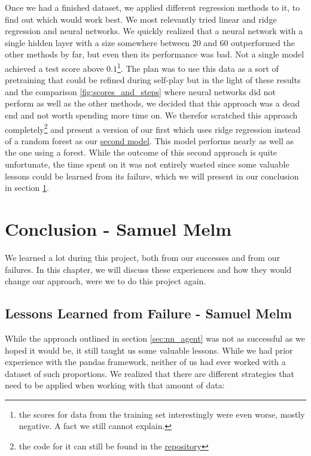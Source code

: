\documentclass{article}
\begin{document}
Once we had a finished dataset, we applied different regression methods to it, to find out which would work best. We most relevantly tried linear and ridge regression and neural networks. We quickly realized that a neural network with a single hidden layer with a size somewhere between 20 and 60 outperformed the other methods by far, but even then its performance was bad. Not a single model achieved a test score above $0.1$\footnote{the scores for data from the training set interestingly were even worse, mostly negative. A fact we still cannot explain.}. The plan was to use this data as a sort of pretraining that could be refined during self-play but in the light of these results and the comparison \ref{fig:scores_and_steps} where neural networks did not perform as well as the other methods, we decided that this approach was a dead end and not worth spending more time on. We therefor scratched this approach completely\footnote{the code for it can still be found in the \href{https://github.com/J-Gann/FML/tree/main/bomberman_rl/agent_code/fail_agent_nn}{repository} } and present a version of our first which uses ridge regression instead of a random forest as our \href{https://github.com/J-Gann/FML/tree/main/bomberman_rl/agent_code/null_agent_rigde}{second model}. This model performs nearly as well as the one using a forest. While the outcome of this second approach is quite unfortunate, the time spent on it was not entirely wasted since some valuable lessons could be learned from its failure, which we will present in our conclusion in section \ref{sec:conclusion}.


\section[Conclusion]{Conclusion {\small - Samuel Melm}} \label{sec:conclusion}

We learned a lot during this project, both from our successes and from our failures. In this chapter, we will discuss these experiences and how they would change our approach, were we to do this project again.

\subsection[Lessons Learned from Failure]{Lessons Learned from Failure {\small - Samuel Melm}}

While the approach outlined in section \ref{sec:nn_agent} was not as successful as we hoped it would be, it still taught us some valuable lessons. While we had prior experience with the pandas framework, neither of us had ever worked with a dataset of such proportions. We realized that there are different strategies that need to be applied when working with that amount of data:
\end{document}
